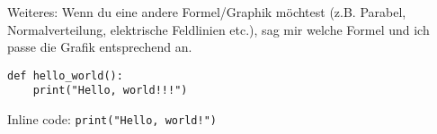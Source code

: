\documentclass[a4paper,12pt]{article}
\begin{document}
\vspace{6mm}

Weiteres: Wenn du eine andere Formel/Graphik möchtest (z.B. Parabel, Normalverteilung, elektrische Feldlinien etc.), sag mir welche Formel und ich passe die Grafik entsprechend an.



\begin{verbatim}
def hello_world():
    print("Hello, world!!!")
\end{verbatim}


Inline code: \texttt{print("Hello, world!")}
\end{document}
